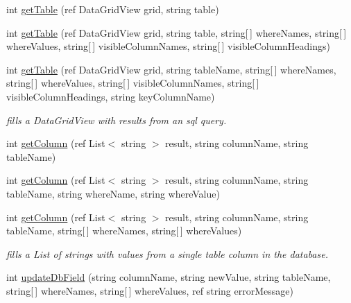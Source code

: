 \begin{DoxyCompactItemize}
\item 
int \hyperlink{class_ias_pbx_config_1_1_db_helper_ac404860e05ce2c60f03893c92ae51cef}{getTable} (ref DataGridView grid, string table)
\item 
int \hyperlink{class_ias_pbx_config_1_1_db_helper_a826d8d2c372759bf407b7da4b5633ff6}{getTable} (ref DataGridView grid, string table, string\mbox{[}$\,$\mbox{]} whereNames, string\mbox{[}$\,$\mbox{]} whereValues, string\mbox{[}$\,$\mbox{]} visibleColumnNames, string\mbox{[}$\,$\mbox{]} visibleColumnHeadings)
\item 
int \hyperlink{class_ias_pbx_config_1_1_db_helper_a10079976d673fae758ec466ffcc1ee11}{getTable} (ref DataGridView grid, string tableName, string\mbox{[}$\,$\mbox{]} whereNames, string\mbox{[}$\,$\mbox{]} whereValues, string\mbox{[}$\,$\mbox{]} visibleColumnNames, string\mbox{[}$\,$\mbox{]} visibleColumnHeadings, string keyColumnName)
\begin{DoxyCompactList}\small\item\em fills a DataGridView with results from an sql query. \item\end{DoxyCompactList}\item 
int \hyperlink{class_ias_pbx_config_1_1_db_helper_a52d4f0ce67921374957b1468cd54b01f}{getColumn} (ref List$<$ string $>$ result, string columnName, string tableName)
\item 
int \hyperlink{class_ias_pbx_config_1_1_db_helper_aee81007408e5c21c279bc01afb4b8cff}{getColumn} (ref List$<$ string $>$ result, string columnName, string tableName, string whereName, string whereValue)
\item 
int \hyperlink{class_ias_pbx_config_1_1_db_helper_a8f01f867cfceb3fbfc8f8c1e1aff8071}{getColumn} (ref List$<$ string $>$ result, string columnName, string tableName, string\mbox{[}$\,$\mbox{]} whereNames, string\mbox{[}$\,$\mbox{]} whereValues)
\begin{DoxyCompactList}\small\item\em fills a List of strings with values from a single table column in the database. \item\end{DoxyCompactList}\item 
int \hyperlink{class_ias_pbx_config_1_1_db_helper_a6e8af81bb90d20f397a5874435e6b382}{updateDbField} (string columnName, string newValue, string tableName, string\mbox{[}$\,$\mbox{]} whereNames, string\mbox{[}$\,$\mbox{]} whereValues, ref string errorMessage)
\item 

\end{DoxyCompactItemize}
